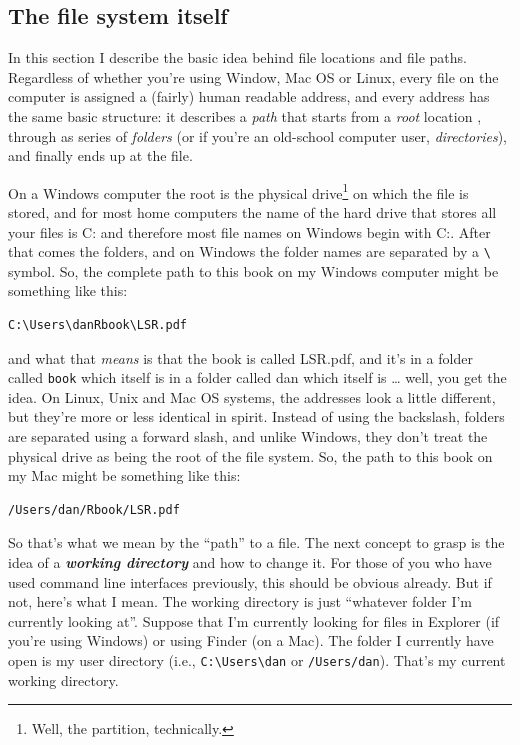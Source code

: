 \documentclass[
]{book}
\begin{document}
\hypertarget{filesystem}{%
\subsection{The file system itself}\label{filesystem}}

In this section I describe the basic idea behind file locations and file paths. Regardless of whether you're using Window, Mac OS or Linux, every file on the computer is assigned a (fairly) human readable address, and every address has the same basic structure: it describes a \emph{path} that starts from a \emph{root} location , through as series of \emph{folders} (or if you're an old-school computer user, \emph{directories}), and finally ends up at the file.

On a Windows computer the root is the physical drive\footnote{Well, the partition, technically.} on which the file is stored, and for most home computers the name of the hard drive that stores all your files is C: and therefore most file names on Windows begin with C:. After that comes the folders, and on Windows the folder names are separated by a \texttt{\textbackslash{}} symbol. So, the complete path to this book on my Windows computer might be something like this:

\begin{verbatim}
C:\Users\danRbook\LSR.pdf
\end{verbatim}

and what that \emph{means} is that the book is called LSR.pdf, and it's in a folder called \texttt{book} which itself is in a folder called dan which itself is \ldots{} well, you get the idea. On Linux, Unix and Mac OS systems, the addresses look a little different, but they're more or less identical in spirit. Instead of using the backslash, folders are separated using a forward slash, and unlike Windows, they don't treat the physical drive as being the root of the file system. So, the path to this book on my Mac might be something like this:

\begin{verbatim}
/Users/dan/Rbook/LSR.pdf
\end{verbatim}

So that's what we mean by the ``path'' to a file. The next concept to grasp is the idea of a \textbf{\emph{working directory}} and how to change it. For those of you who have used command line interfaces previously, this should be obvious already. But if not, here's what I mean. The working directory is just ``whatever folder I'm currently looking at''. Suppose that I'm currently looking for files in Explorer (if you're using Windows) or using Finder (on a Mac). The folder I currently have open is my user directory (i.e., \texttt{C:\textbackslash{}Users\textbackslash{}dan} or \texttt{/Users/dan}). That's my current working directory.
\end{document}
